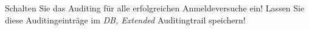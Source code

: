     \item Schalten Sie das Auditing f\"ur alle erfolgreichen Anmeldeversuche ein! Lassen Sie diese Auditingeintr\"age im \textit{DB, Extended} Auditingtrail speichern!
